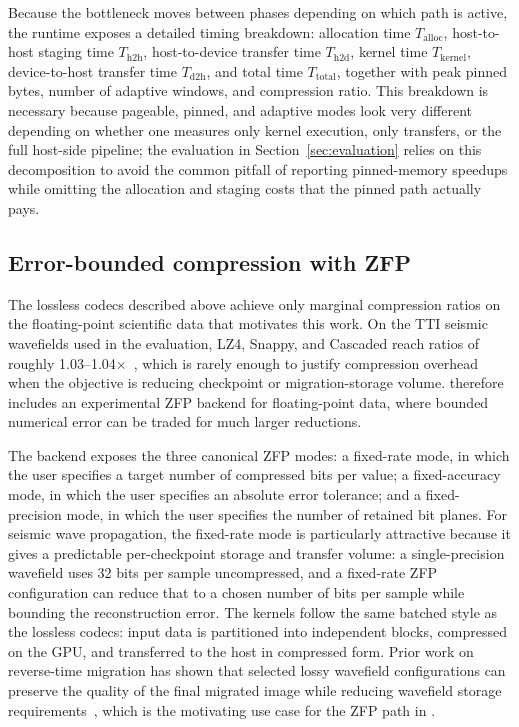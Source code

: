 Because the bottleneck moves between phases depending on which path
is active, the runtime exposes a detailed timing breakdown:
allocation time $T_{\text{alloc}}$, host-to-host staging time
$T_{\text{h2h}}$, host-to-device transfer time $T_{\text{h2d}}$,
kernel time $T_{\text{kernel}}$, device-to-host transfer time
$T_{\text{d2h}}$, and total time $T_{\text{total}}$, together with
peak pinned bytes, number of adaptive windows, and compression ratio.
This breakdown is necessary because pageable, pinned, and adaptive
modes look very different depending on whether one measures only
kernel execution, only transfers, or the full host-side pipeline; the
evaluation in Section~\ref{sec:evaluation} relies on this
decomposition to avoid the common pitfall of reporting pinned-memory
speedups while omitting the allocation and staging costs that the
pinned path actually pays.

\subsection{Error-bounded compression with ZFP}
\label{sec:arcto-zfp}

The lossless codecs described above achieve only marginal compression
ratios on the floating-point scientific data that motivates this work.
On the TTI seismic wavefields used in the evaluation, LZ4, Snappy, and
Cascaded reach ratios of roughly
1.03--1.04$\times$~\cite{anon_iccsa2026}, which is rarely enough to
justify compression overhead when the objective is reducing
checkpoint or migration-storage volume. \arcto{} therefore includes
an experimental ZFP backend for floating-point data, where bounded
numerical error can be traded for much larger reductions.

The backend exposes the three canonical ZFP modes: a fixed-rate mode,
in which the user specifies a target number of compressed bits per
value; a fixed-accuracy mode, in which the user specifies an absolute
error tolerance; and a fixed-precision mode, in which the user
specifies the number of retained bit planes. For seismic wave
propagation, the fixed-rate mode is particularly attractive because
it gives a predictable per-checkpoint storage and transfer volume:
a single-precision wavefield uses 32 bits per sample uncompressed,
and a fixed-rate ZFP configuration can reduce that to a chosen
number of bits per sample while bounding the reconstruction error.
The kernels follow the same batched style as the lossless codecs:
input data is partitioned into independent blocks, compressed on the
GPU, and transferred to the host in compressed form. Prior work on
reverse-time migration has shown that selected lossy wavefield
configurations can preserve the quality of the final migrated image
while reducing wavefield storage
requirements~\cite{barbosa2023rtmcompression}, which is the
motivating use case for the ZFP path in \arcto{}.

